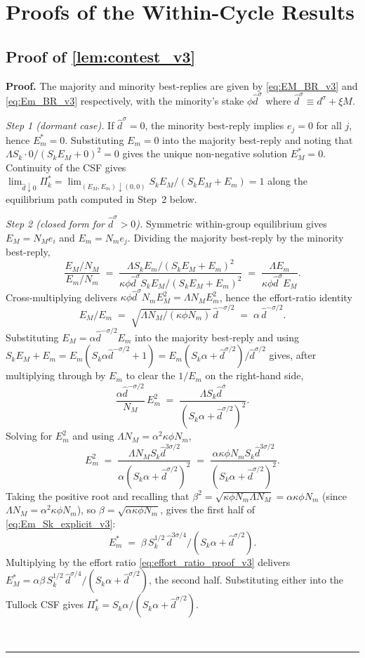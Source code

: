 \documentclass[11pt,twoside]{extarticle}
\newenvironment{proof}[1][Proof]{\noindent \textbf{#1.} }{\ \rule{0.5em}{0.5em}}
\begin{document}
\section{Proofs of the Within-Cycle Results} \label{app:proofs_v3}

\subsection*{Proof of \autoref{lem:contest_v3}} \label{app:proof:contest_v3}
\begin{proof}
The majority and minority best-replies are given by \eqref{eq:EM_BR_v3} and \eqref{eq:Em_BR_v3} respectively, with the minority's stake $\phi\hat d^\sigma$ where $\hat d^\sigma\equiv d^\sigma+\xi M$.

\emph{Step 1 (dormant case).} If $\hat d^\sigma=0$, the minority best-reply implies $e_j=0$ for all $j$, hence $E_m^*=0$. Substituting $E_m=0$ into the majority best-reply and noting that $\Lambda S_k\cdot 0/(S_kE_M+0)^2=0$ gives the unique non-negative solution $E_M^*=0$. Continuity of the CSF gives $\lim_{\hat d\downarrow 0}\Pi_k^*=\lim_{(E_M,E_m)\downarrow(0,0)}S_kE_M/(S_kE_M+E_m)=1$ along the equilibrium path computed in Step~2 below.

\emph{Step 2 (closed form for $\hat d^\sigma>0$).} Symmetric within-group equilibrium gives $E_M=N_Me_i$ and $E_m=N_me_j$. Dividing the majority best-reply by the minority best-reply,
\[
\frac{E_M/N_M}{E_m/N_m}\;=\;\frac{\Lambda S_kE_m/(S_kE_M+E_m)^2}{\kappa\phi\hat d^\sigma S_kE_M/(S_kE_M+E_m)^2}\;=\;\frac{\Lambda E_m}{\kappa\phi\hat d^\sigma E_M}.
\]
Cross-multiplying delivers $\kappa\phi\hat d^\sigma N_m E_M^2=\Lambda N_M E_m^2$, hence the effort-ratio identity
\begin{equation}\label{eq:effort_ratio_proof_v3}
E_M/E_m\;=\;\sqrt{\Lambda N_M/(\kappa\phi N_m)}\,\hat d^{-\sigma/2}\;=\;\alpha\,\hat d^{-\sigma/2}.
\end{equation}
Substituting $E_M=\alpha\hat d^{-\sigma/2}E_m$ into the majority best-reply and using
$S_kE_M+E_m=E_m(S_k\alpha\hat d^{-\sigma/2}+1)=E_m(S_k\alpha+\hat d^{\sigma/2})/\hat d^{\sigma/2}$
gives, after multiplying through by $E_m$ to clear the $1/E_m$ on the right-hand side,
\[
\frac{\alpha\hat d^{-\sigma/2}}{N_M}\,E_m^2\;=\;\frac{\Lambda S_k\hat d^\sigma}{(S_k\alpha+\hat d^{\sigma/2})^2}.
\]
Solving for $E_m^2$ and using $\Lambda N_M=\alpha^2\kappa\phi N_m$,
\[
E_m^2\;=\;\frac{\Lambda N_M S_k\hat d^{3\sigma/2}}{\alpha(S_k\alpha+\hat d^{\sigma/2})^2}\;=\;\frac{\alpha\kappa\phi N_m S_k\hat d^{3\sigma/2}}{(S_k\alpha+\hat d^{\sigma/2})^2}.
\]
Taking the positive root and recalling that $\beta^2=\sqrt{\kappa\phi N_m\Lambda N_M}=\alpha\kappa\phi N_m$ (since $\Lambda N_M=\alpha^2\kappa\phi N_m$), so $\beta=\sqrt{\alpha\kappa\phi N_m}$, gives the first half of \eqref{eq:Em_Sk_explicit_v3}:
\[
E_m^*\;=\;\beta\,S_k^{1/2}\,\hat d^{3\sigma/4}/(S_k\alpha+\hat d^{\sigma/2}).
\]
Multiplying by the effort ratio \eqref{eq:effort_ratio_proof_v3} delivers $E_M^*=\alpha\beta\,S_k^{1/2}\,\hat d^{\sigma/4}/(S_k\alpha+\hat d^{\sigma/2})$, the second half. Substituting either into the Tullock CSF gives $\Pi_k^*=S_k\alpha/(S_k\alpha+\hat d^{\sigma/2})$.


\end{proof}
\end{document}
